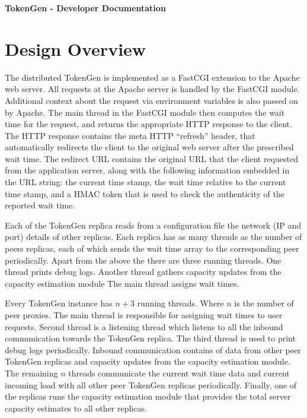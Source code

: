 \documentclass[12pt]{report}
\begin{document}
\vspace{1.5in}
{\LARGE \textbf{TokenGen - Developer Documentation }}
\pagebreak
{}


\section*{Design Overview} %


The distributed TokenGen is implemented as a FastCGI extension to the
Apache web server. All requests at the Apache server is handled by the
FastCGI module. Additional context about the request via environment
variables is also passed on by Apache. The main thread in the FastCGI
module then computes the wait time for the request, and returns the
appropriate HTTP response to the client. The HTTP response contains the
meta HTTP “refresh” header, that automatically redirects the client to
the original web server  after the prescribed wait time. The redirect
URL contains the original URL that the client requested from the
application server, along with the following information embedded in
the URL string: the current time stamp, the wait time relative to the
current time stamp, and a HMAC token that is used to check the
authenticity of the reported wait time.

Each of the TokenGen replica reads from a configuration file the network (IP
and port) details of other replicas. Each replica has as many
threads as the number of peers replicas, each of which sends the wait
time array to the corresponding peer periodically. Apart from the
above the there are three running threads. One thread prints debug
logs. Another thread gathers capacity updates from the capacity
estimation module The main thread assigns wait times.

Every TokenGen instance has $n+3$ running threads. Where $n$ is the
number of peer proxies. The main thread is responsible for assigning
wait times to user requests. Second thread is a listening thread which
listens to all the inbound communication towards the TokenGen replica.
The third thread is used to print debug logs periodically. Inbound
communication contains of data from other peer TokenGen replicas and
capacity updates from the capacity estimation module. The remaining
$n$ threads communicate the current wait time data and current
incoming load with all other peer TokenGen replicas periodically.
Finally, one of the replicas runs the capacity estimation module that
provides the total server capacity estimates to all other replicas.
\end{document}
